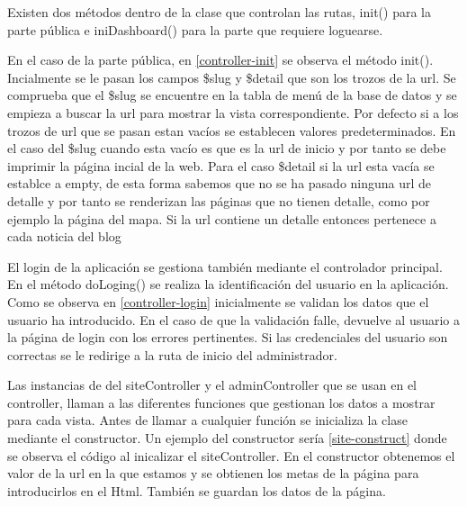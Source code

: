 \vspace{5 mm}

Existen dos métodos dentro de la clase que controlan las rutas, init() para la parte pública e iniDashboard() para la parte que requiere loguearse.

\vspace{5 mm}

En el caso de la parte pública, en \ref{controller-init} se observa el método init(). Incialmente se le pasan los campos \$slug y \$detail que son los trozos de la url.
Se comprueba que el \$slug se encuentre en la tabla de menú de la base de datos y se empieza a buscar la url para mostrar la vista correspondiente. Por defecto si a los trozos de url que se pasan estan vacíos se establecen valores predeterminados. En el caso del \$slug cuando esta vacío es que es la url de inicio y por tanto se debe imprimir la página incial de la web. Para el caso \$detail si la url esta vacía se establce a empty, de esta forma sabemos que no se ha pasado ninguna url de detalle y por tanto se renderizan las páginas que no tienen detalle, como por ejemplo la página del mapa. Si la url contiene un detalle entonces pertenece a cada noticia del blog

\vspace{5 mm}

El login de la aplicación se gestiona también mediante el controlador principal. En el método doLoging() se realiza la identificación del usuario en la
aplicación. Como se observa en \ref{controller-login} inicialmente se validan los datos que el usuario ha introducido. En el caso de que la validación falle, devuelve al usuario a la página de login con los errores pertinentes. Si las credenciales del usuario son correctas se le redirige a la ruta de inicio del administrador.

\vspace{5 mm}

Las instancias de del siteController y el adminController que se usan en el controller, llaman a las diferentes funciones que gestionan los datos a
mostrar para cada vista. Antes de llamar a cualquier función se inicializa la clase mediante el constructor. Un ejemplo del constructor sería \ref{site-construct} donde se observa el código al inicalizar el siteController. En el constructor obtenemos el valor de la url en la que estamos y se obtienen los metas de la página  para introducirlos en el Html. También se guardan los datos de la página.

\vspace{5 mm}

